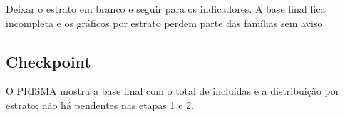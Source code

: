 \begin{alerta}
Deixar o estrato em branco e seguir para os indicadores. A base final fica incompleta e os gráficos
por estrato perdem parte das famílias sem aviso.
\end{alerta}

\subsection*{Checkpoint}
\marcador\; O PRISMA mostra a base final com o total de incluídas e a distribuição por estrato; não há
pendentes nas etapas 1 e 2.

